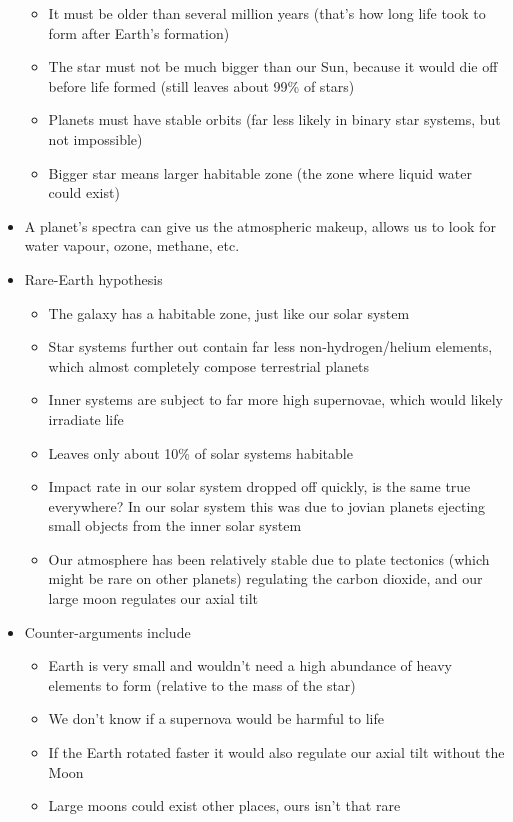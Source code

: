 \documentclass[12pt]{article}
\begin{document}
\begin{itemize}
\begin{itemize}
        \item It must be older than several million years (that's how long life took to form after Earth's formation)
        \item The star must not be much bigger than our Sun, because it would die off before life formed (still leaves about 99\% of stars)
        \item Planets must have stable orbits (far less likely in binary star systems, but not impossible)
        \item Bigger star means larger habitable zone (the zone where liquid water could exist)
    \end{itemize}
    \item A planet's spectra can give us the atmospheric makeup, allows us to look for water vapour, ozone, methane, etc.
    \item Rare-Earth hypothesis
    \begin{itemize}
        \item The galaxy has a habitable zone, just like our solar system
        \item Star systems further out contain far less non-hydrogen/helium elements, which almost completely compose terrestrial planets
        \item Inner systems are subject to far more high supernovae, which would likely irradiate life
        \item Leaves only about 10\% of solar systems habitable
        \item Impact rate in our solar system dropped off quickly, is the same true everywhere?  In our solar system this was due to jovian planets ejecting small objects from the inner solar system
        \item Our atmosphere has been relatively stable due to plate tectonics (which might be rare on other planets) regulating the carbon dioxide, and our large moon regulates our axial tilt
    \end{itemize}
    \item Counter-arguments include
    \begin{itemize}
        \item Earth is very small and wouldn't need a high abundance of heavy elements to form (relative to the mass of the star)
        \item We don't know if a supernova would be harmful to life
        \item If the Earth rotated faster it would also regulate our axial tilt without the Moon
        \item Large moons could exist other places, ours isn't that rare

\end{itemize}
\end{itemize}
\end{document}
